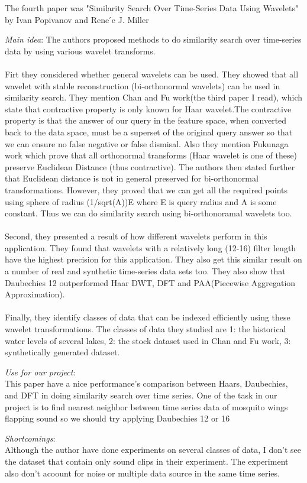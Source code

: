 The fourth paper was "Similarity Search Over Time-Series Data Using Wavelets" by Ivan Popivanov and Rene ́e J. Miller
\begin{itemize*}
\item {\em Main idea}:
The authors proposed methods to do similarity search over time-series data by using various wavelet transforms. \\\\
Firt they considered whether general wavelets can be used. They showed that all wavelet with stable reconstruction (bi-orthonormal wavelets) can be used in similarity search. They mention Chan and Fu work(the third paper I read), which state that contractive property is only known for Haar wavelet.The contractive property is that the answer of our query in the feature space, when converted back to the data space, must be a superset of the original query answer so that we can ensure no false negative or false dismisal. Also they mention Fukunaga work which prove that all orthonormal transforms (Haar wavelet is one of these) preserve Euclidean Distance (thus contractive). The authors then stated further that Euclidean distance is not in general preserved for bi-orthonormal transformations. However, they proved that we can get all the required points using sphere of radius (1/sqrt(A))E where E is query radius and A is some constant. Thus we can do similarity search using bi-orthonoramal wavelets too.\\\\
Second, they presented a result of how different wavelets perform in this application. They found that wavelets with a relatively long (12-16) filter length have the highest precision for this application. They also get this similar result on a number of real and synthetic time-series data sets too. They also show that Daubechies 12 outperformed Haar DWT, DFT and PAA(Piecewise Aggregation Approximation).\\\\
Finally, they identify classes of data that can be indexed efficiently using these wavelet transformations. The classes of data they studied are 1: the historical water levels of several lakes, 2: the stock dataset used in Chan and Fu work, 3: synthetically generated dataset. 

\item {\em Use for our project}:\\
This paper have a nice performance's comparison between Haars, Daubechies, and DFT in doing similarity search over time series. One of the task in our project is to find nearest neighbor between time series data of mosquito wings flapping sound so we should try applying Daubechies 12 or 16  
\\
\item {\em Shortcomings}:\\
Although the author have done experiments on several classes of data, I don't see the dataset that contain only sound clips in their experiment. The experiment also don't acoount for noise or multiple data source in the same time series.

\end{itemize*}


